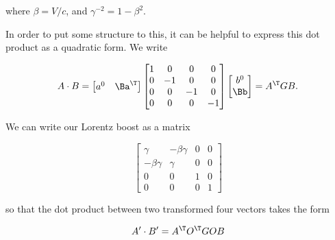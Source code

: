 where $\beta = V/c$, and $\gamma^{-2} = 1 - \beta^2$.

In order to put some structure to this, it can be helpful to express this dot product as a quadratic form.  We write

\begin{align}\label{eqn:relativisticElectrodynamicsT1:100}
A \cdot B = 
\begin{bmatrix}
a^0 & \Ba^\T 
\end{bmatrix}
\begin{bmatrix}
1 & 0 & 0 & 0 \\
0 & -1 & 0 & 0 \\
0 & 0 & -1 & 0 \\
0 & 0 & 0 & -1 
\end{bmatrix}
\begin{bmatrix}
b^0 \\
\Bb
\end{bmatrix}
= A^\T G B.
\end{align}

We can write our Lorentz boost as a matrix

\begin{equation}\label{eqn:relativisticElectrodynamicsT1:110}
\begin{bmatrix}
\gamma & -\beta \gamma & 0 & 0 \\
-\beta \gamma & \gamma & 0 & 0 \\
0 & 0 & 1 & 0 \\
0 & 0 & 0 & 1 
\end{bmatrix}
\end{equation}

so that the dot product between two transformed four vectors takes the form

\begin{equation}\label{eqn:relativisticElectrodynamicsT1:120}
A' \cdot B' = A^\T O^\T G O B
\end{equation}
